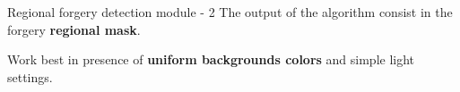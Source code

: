 \begin{tframe}{Regional forgery detection module - 2}
\vspace{0.1cm}
The output of the algorithm consist in the forgery \textbf{regional mask}.
\vspace{0.2cm}

\vspace{0.2cm}
Work best in presence of \textbf{uniform backgrounds colors} and simple light settings.
\end{tframe}


